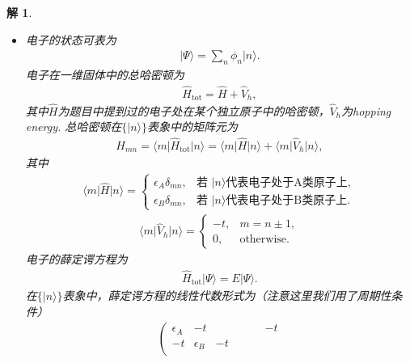 \documentclass[UTF8,10pt,a4paper]{article}
\theoremstyle{Problem}
\theoremstyle{Solution}
\newtheorem*{sol}{解}
\begin{document}
\begin{sol}
    \begin{itemize}
        \item[$\triangleright$] 电子的状态可表为
        \begin{align}
            \lvert\Psi\rangle=\sum_n\phi_n\lvert n\rangle.
        \end{align}
        电子在一维固体中的总哈密顿为
        \begin{align}
            \hat{H}_{\text{tot}}=\hat{H}+\hat{V}_h,
        \end{align}
        其中$\hat{H}$为题目中提到过的电子处在某个独立原子中的哈密顿，$\hat{V}_h$为hopping energy. 总哈密顿在$\{\lvert n\rangle\}$表象中的矩阵元为
        \begin{align}
            H_{mn}=\langle m\rvert\hat{H}_{\text{tot}}\rvert n\rangle=\langle m\rvert\hat{H}\lvert n\rangle+\langle m\rvert\hat{V}_h\lvert n\rangle,
        \end{align}
        其中
        \begin{align}
            \langle m\rvert\hat{H}\lvert n\rangle=\left\{\begin{array}{ll}
                \epsilon_A\delta_{mn},&\text{若 }\lvert n\rangle\text{代表电子处于A类原子上},\\
                \epsilon_B\delta_{mn},&\text{若 }\lvert n\rangle\text{代表电子处于B类原子上}.
            \end{array}\right.
        \end{align}
        \begin{align}
            \langle m\rvert\hat{V}_h\lvert n\rangle=\left\{\begin{array}{ll}
                -t,&m=n\pm1,\\
                0,&\text{otherwise}.
            \end{array}\right.
        \end{align}
        电子的薛定谔方程为
        \begin{align}
            \hat{H}_{\text{tot}}\lvert\Psi\rangle=E\lvert\Psi\rangle.
        \end{align}
        在$\{\lvert n\rangle\}$表象中，薛定谔方程的线性代数形式为（注意这里我们用了周期性条件）
        \begin{align}
            \left(\begin{matrix}
                \epsilon_A & -t &  &  &  &  & -t \\
                -t & \epsilon_B & -t &  &  &  &  \\

\end{matrix}
\end{align}
\end{itemize}
\end{sol}
\end{document}

